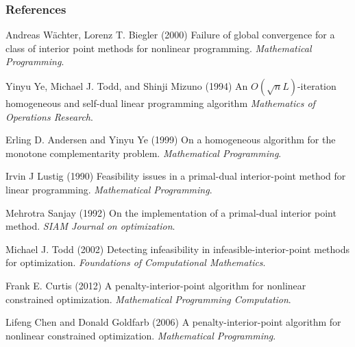 \begin{frame}[allowframebreaks] \note{ } 

\frametitle{References}
\footnotesize{
\begin{thebibliography}{99} %

 Andreas W{\"a}chter, Lorenz T. Biegler (2000)
\newblock Failure of global convergence for a class of interior point methods for nonlinear programming. \emph{Mathematical Programming}.


 Yinyu Ye, Michael J. Todd, and Shinji Mizuno (1994)
\newblock An $O (\sqrt{n}L)$-iteration homogeneous and self-dual linear programming algorithm \emph{Mathematics of Operations Research}.

 Erling D. Andersen and Yinyu Ye (1999)
\newblock On a homogeneous algorithm for the monotone complementarity problem. \emph{Mathematical Programming}.

 Irvin J Lustig (1990)
\newblock Feasibility issues in a primal-dual interior-point method for linear programming. \emph{Mathematical Programming}.

 Mehrotra Sanjay (1992)
\newblock On the implementation of a primal-dual interior point method. \emph{SIAM Journal on optimization}.

 Michael J. Todd (2002)
\newblock Detecting infeasibility in infeasible-interior-point methods for optimization. \emph{Foundations of Computational Mathematics}.

 Frank E. Curtis (2012)
\newblock A penalty-interior-point algorithm for nonlinear constrained optimization. \emph{Mathematical Programming Computation}.

 Lifeng Chen and Donald Goldfarb (2006)
\newblock A penalty-interior-point algorithm for nonlinear constrained optimization. \emph{Mathematical Programming}.


\end{thebibliography}
}

\end{frame}

\note{}

 